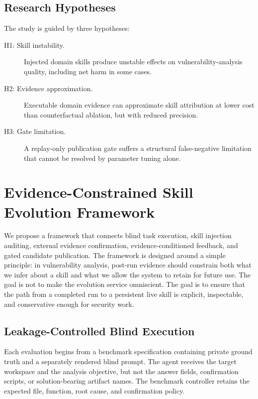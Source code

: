 ﻿\documentclass[preprint,12pt]{elsarticle}
\begin{document}
\subsection{Research Hypotheses}

The study is guided by three hypotheses:

\begin{description}
    \item[H1: Skill instability.] Injected domain skills produce unstable
    effects on vulnerability-analysis quality, including net harm in some
    cases.
    \item[H2: Evidence approximation.] Executable domain evidence can
    approximate skill attribution at lower cost than counterfactual
    ablation, but with reduced precision.
    \item[H3: Gate limitation.] A replay-only publication gate suffers a
    structural false-negative limitation that cannot be resolved by
    parameter tuning alone.
\end{description}

\section{Evidence-Constrained Skill Evolution Framework}
\label{sec:method}

We propose a framework that connects blind task execution, skill injection
auditing, external evidence confirmation, evidence-conditioned feedback,
and gated candidate publication.  The framework is designed around a simple
principle: in vulnerability analysis, post-run evidence should constrain
both what we infer about a skill and what we allow the system to retain for
future use.  The goal is not to make the evolution service omniscient.  The
goal is to ensure that the path from a completed run to a persistent live
skill is explicit, inspectable, and conservative enough for security work.

\subsection{Leakage-Controlled Blind Execution}
\label{sec:blind}

Each evaluation begins from a benchmark specification containing private
ground truth and a separately rendered blind prompt.  The agent receives
the target workspace and the analysis objective, but not the answer fields,
confirmation scripts, or solution-bearing artifact names.  The benchmark
controller retains the expected file, function, root cause, and
confirmation policy.
\end{document}
